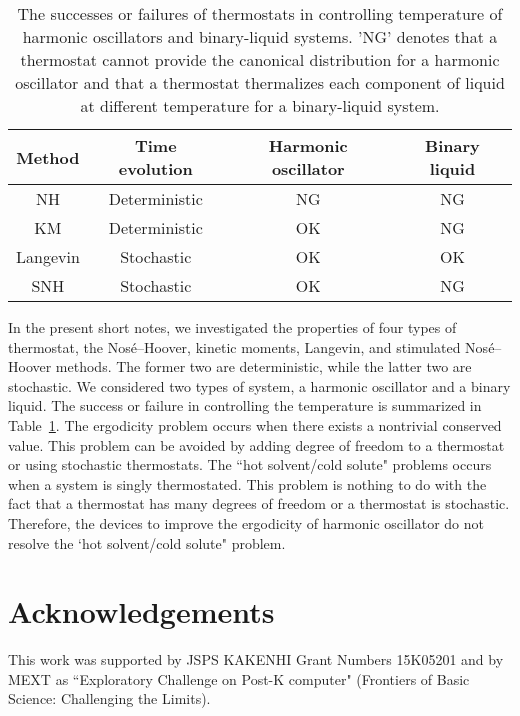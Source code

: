 \documentclass[pre,twocolumn]{revtex4}
\begin{document}

\begin{table}
\begin{tabular}{cccc}
\hline
Method & Time evolution & Harmonic oscillator & Binary liquid \\
\hline
NH & Deterministic & NG & NG \\
KM & Deterministic & OK & NG \\
Langevin & Stochastic & OK & OK \\
SNH & Stochastic & OK & NG \\
\hline
\end{tabular}
\caption{
The successes or failures of thermostats in controlling temperature 
of harmonic oscillators and binary-liquid systems.
'NG' denotes that a thermostat cannot provide the
canonical distribution for a harmonic oscillator
and that a thermostat thermalizes each component of liquid
at different temperature for a binary-liquid system.
}
\label{table_thermostats}
\end{table}

In the present short notes, we investigated the properties of four types of thermostat,
the Nos\'e--Hoover,
kinetic moments,
Langevin, and stimulated Nos\'e--Hoover methods.
The former two are deterministic, while the latter two are stochastic.
We considered two types of system, a harmonic oscillator
and a binary liquid. The success or failure in controlling the temperature
is summarized in Table~\ref{table_thermostats}.
The ergodicity problem occurs when there exists a nontrivial conserved value.
This problem can be avoided by adding degree of freedom to a thermostat or
using stochastic thermostats.
The ``hot solvent/cold solute" problems occurs when a system is singly thermostated.
This problem is nothing to do with the fact that a thermostat has many degrees of freedom
or a thermostat is stochastic. Therefore, the devices to improve the ergodicity
of harmonic oscillator do not resolve the `hot solvent/cold solute" problem.

\section*{Acknowledgements}
This work was supported by JSPS KAKENHI Grant Numbers 15K05201 and
by MEXT as ``Exploratory Challenge on Post-K computer" (Frontiers of Basic Science: Challenging the Limits).


\end{document}
